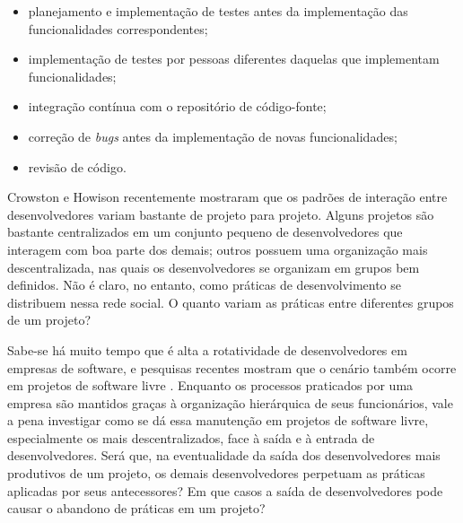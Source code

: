 \documentclass{article}
\begin{document}
\begin{itemize}
  \item planejamento e implementação de testes antes da implementação das
  funcionalidades correspondentes;
  \item implementação de testes por pessoas diferentes daquelas que
  implementam funcionalidades;
  \item integração contínua com o repositório de código-fonte;
  \item correção de \emph{bugs} antes da implementação de novas funcionalidades;
  \item revisão de código.
\end{itemize}

Crowston e Howison \cite{crowston2005} recentemente mostraram que os padrões de
interação entre desenvolvedores variam bastante de projeto para projeto. Alguns
projetos são bastante centralizados em um conjunto pequeno de desenvolvedores
que interagem com boa parte dos demais; outros possuem uma organização mais
descentralizada, nas quais os desenvolvedores se organizam em grupos bem
definidos. Não é claro, no entanto, como práticas de desenvolvimento se
distribuem nessa rede social. O quanto variam as práticas entre diferentes
grupos de um projeto? 


Sabe-se há muito tempo que é alta a rotatividade de desenvolvedores em empresas
de software, e pesquisas recentes mostram que o cenário também ocorre em
projetos de software livre \cite{robles2006}. Enquanto os processos praticados
por uma empresa são mantidos graças à organização hierárquica de seus
funcionários, vale a pena investigar como se dá essa manutenção em projetos de
software livre, especialmente os mais descentralizados, face à saída e à entrada
de desenvolvedores. Será que, na eventualidade da saída dos desenvolvedores mais
produtivos de um projeto, os demais desenvolvedores perpetuam as práticas
aplicadas por seus antecessores? Em que casos a saída de desenvolvedores pode
causar o abandono de práticas em um projeto?
\end{document}
